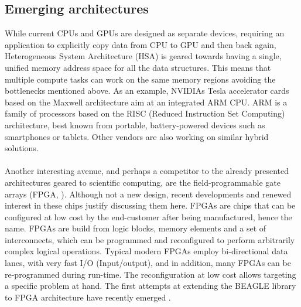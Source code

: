 \subsection{Emerging architectures}

While current CPUs and GPUs are designed as separate devices, requiring an application to explicitly copy data from CPU to GPU and then back again, Heterogeneous System Architecture (HSA) is geared towards having a single, unified memory address space for all the data structures.
This means that multiple compute tasks can work on the same memory regions avoiding the bottlenecks mentioned above.
As an example, NVIDIAs Tesla accelerator cards based on the Maxwell architecture aim at an integrated ARM CPU. %
ARM is a family of processors based on the RISC (Reduced Instruction Set Computing) architecture, best known from portable, battery-powered devices such as smartphones or tablets. 
Other vendors are also working on similar hybrid solutions.

\paragraph{}
Another interesting avenue, and perhaps a competitor to the already presented architectures geared to scientific computing, are the field-programmable gate arrays (FPGA, \citet{Kuon2008}).
Although not a new design, recent developments and renewed interest in these chips justify discussing them here.
FPGAs are chips that can be configured at low cost by the end-customer after being manufactured, hence the name.
FPGAs are build from logic blocks, memory elements and a set of interconnects, which can be programmed and reconfigured to perform arbitrarily complex logical operations.
Typical modern FPGAs employ bi-directional data lanes, with very fast I/O (Input/output), and in addition, many FPGAs can be re-programmed during run-time. 
%
%
The reconfiguration at low cost allows targeting a specific problem at hand.
The first attempts at extending the BEAGLE library to FPGA architecture have recently emerged \citep{Jin2013}.

